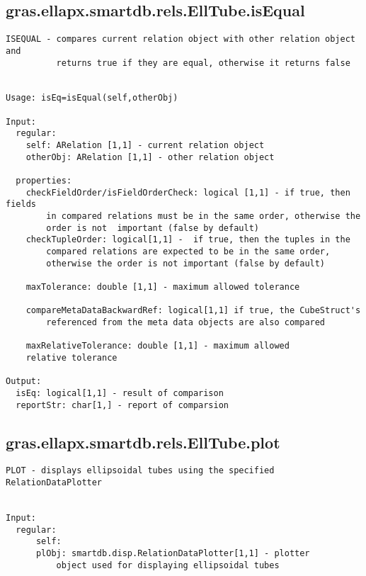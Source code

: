\subsection{\texorpdfstring{gras.ellapx.smartdb.rels.EllTube.isEqual}{isEqual}}\label{method:gras.ellapx.smartdb.rels.EllTube.isEqual}
\begin{verbatim}
ISEQUAL - compares current relation object with other relation object and
          returns true if they are equal, otherwise it returns false


Usage: isEq=isEqual(self,otherObj)

Input:
  regular:
    self: ARelation [1,1] - current relation object
    otherObj: ARelation [1,1] - other relation object

  properties:
    checkFieldOrder/isFieldOrderCheck: logical [1,1] - if true, then fields
        in compared relations must be in the same order, otherwise the
        order is not  important (false by default)
    checkTupleOrder: logical[1,1] -  if true, then the tuples in the
        compared relations are expected to be in the same order,
        otherwise the order is not important (false by default)

    maxTolerance: double [1,1] - maximum allowed tolerance

    compareMetaDataBackwardRef: logical[1,1] if true, the CubeStruct's
        referenced from the meta data objects are also compared

    maxRelativeTolerance: double [1,1] - maximum allowed
    relative tolerance

Output:
  isEq: logical[1,1] - result of comparison
  reportStr: char[1,] - report of comparsion
\end{verbatim}
\subsection{\texorpdfstring{gras.ellapx.smartdb.rels.EllTube.plot}{plot}}\label{method:gras.ellapx.smartdb.rels.EllTube.plot}
\begin{verbatim}
PLOT - displays ellipsoidal tubes using the specified RelationDataPlotter


Input:
  regular:
      self:
      plObj: smartdb.disp.RelationDataPlotter[1,1] - plotter
          object used for displaying ellipsoidal tubes
\end{verbatim}
